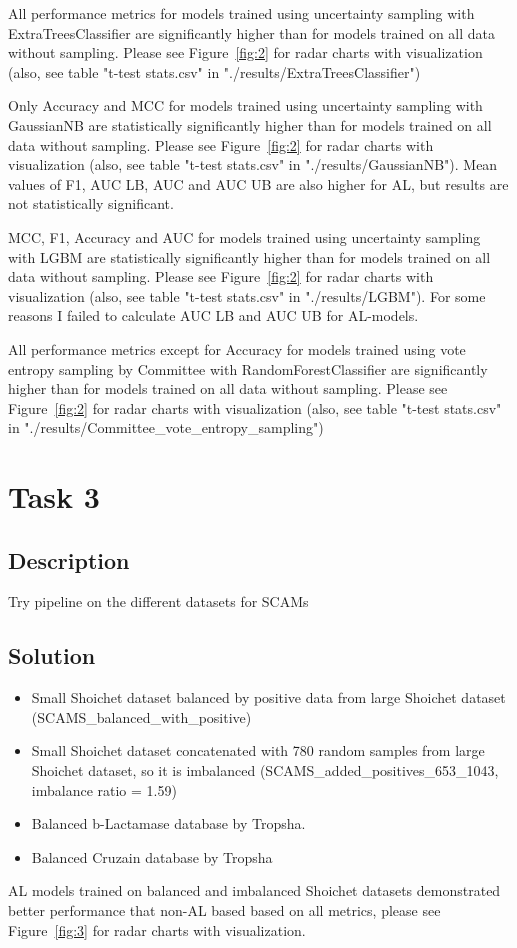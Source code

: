 \documentclass[a4paper,10pt]{article}
\begin{document}
All performance metrics for models trained using uncertainty sampling with ExtraTreesClassifier are significantly higher than for models trained on all data without sampling. Please see Figure~\ref{fig:2} for radar charts with visualization (also, see table "t-test stats.csv" in "./results/ExtraTreesClassifier")

Only Accuracy and MCC for models trained using uncertainty sampling with GaussianNB are statistically significantly higher than for models trained on all data without sampling. Please see Figure~\ref{fig:2} for radar charts with visualization (also, see table "t-test stats.csv" in "./results/GaussianNB"). Mean values of F1, AUC LB, AUC and AUC UB are also higher for AL,  but results are not statistically significant.

MCC, F1, Accuracy and AUC for models trained using uncertainty sampling with LGBM are statistically significantly higher than for models trained on all data without sampling. Please see Figure~\ref{fig:2} for radar charts with visualization (also, see table "t-test stats.csv" in "./results/LGBM"). For some reasons I failed to calculate AUC LB and AUC UB for AL-models.

All performance metrics except for Accuracy for models trained using vote entropy sampling by Committee with RandomForestClassifier are significantly higher than for models trained on all data without sampling. Please see Figure~\ref{fig:2} for radar charts with visualization (also, see table "t-test stats.csv" in "./results/Committee\_vote\_entropy\_sampling")

\section{Task 3}
\subsection{Description}
Try pipeline on the different datasets for SCAMs
\subsection{Solution}
\begin{itemize}
\item Small Shoichet dataset balanced by positive data from large Shoichet dataset (SCAMS\_balanced\_with\_positive) 
\item Small Shoichet dataset concatenated with 780 random samples from large Shoichet dataset, so it is imbalanced (SCAMS\_added\_positives\_653\_1043, imbalance ratio = 1.59)
\item Balanced b-Lactamase database by Tropsha. 
\item Balanced Cruzain database by Tropsha
\end{itemize}
AL models trained on balanced and imbalanced Shoichet datasets demonstrated better performance that non-AL based based on all metrics, please see Figure~\ref{fig:3} for radar charts with visualization. 
\end{document}
